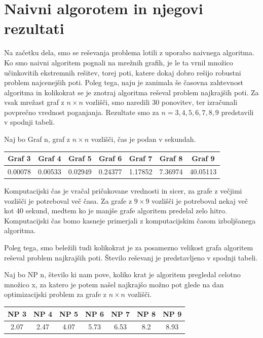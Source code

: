 \documentclass[a4paper, 12 pt]{article}
\theoremstyle{definition} %
\theoremstyle{plain} %
\theoremstyle{definition}
\begin{document}
\section{Naivni algorotem in njegovi rezultati}

Na začetku dela, smo se reševanja problema lotili z uporabo naivnega algoritma. Ko smo naivni algoritem pognali na mrežnih grafih, je le ta vrnil množico učinkovitih ekstremnih rešitev, torej poti, katere dokaj dobro rešijo robustni problem najcenejših poti. Poleg tega, naju je zanimala še časovna zahtevnost algoritma in kolikokrat se je znotraj algoritma reševal problem najkrajših poti.
Za vsak mrežast graf z $n \times n$ vozlišči, smo naredili 30 ponovitev, ter izračunali povprečno vrednost poganjanja. Rezultate smo za $n = 3, 4, 5, 6, 7, 8, 9$ predstavili v spodnji tabeli.\newline


Naj bo Graf n, graf z $n \times n$ vozlišči, čas je podan v sekundah.

\begin{center}
 \begin{tabular}{||c c c c c c c||} 
 \hline
Graf 3 & Graf 4 & Graf 5 & Graf 6 & Graf 7 & Graf 8 & Graf 9 \\ 
 \hline
\hline
0.00078 & 0.00533 & 0.02949 & 0.24377 & 1.17852 & 7.36974 & 40.05113 \\
 \hline
\end{tabular}
\end{center}

Komputacijski čas je vračal pričakovane vrednosti in sicer, za grafe z večjimi vozlišči je potreboval več časa. Za grafe z $9 \times 9$ vozlišči je potreboval nekaj več kot 40 sekund, medtem ko je manjše grafe algoritem predelal zelo hitro. Komputacijski čas bomo kasneje primerjali z komputacijskim časom izboljšanega algoritma.\newline

Poleg tega, smo beležili tudi kolikokrat je za posamezno velikost grafa algoritem reševal problem najkrajših poti. Število reševanj je predstavljeno v spodnji tabeli.\newline

\bigskip
Naj bo NP n, število ki nam pove, koliko krat je algoritem pregledal celotno množico x, za katero je potem našel najkrajšo možno pot glede na dan optimizacijski problem za grafe z $n \times n$ vozlišči.
\begin{center}
 \begin{tabular}{||c c c c c c c||} 
 \hline
 NP 3 &  NP 4 &  NP 5 &  NP 6 &  NP 7 &  NP 8 &  NP 9 \\ 
 \hline
\hline
2.07 & 2.47 & 4.07 & 5.73 & 6.53 & 8.2 & 8.93\\
 \hline
\end{tabular}
\end{center}
\end{document}

